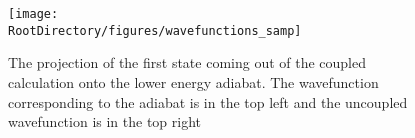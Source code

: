 \begin{figure}[ht]
\begin{center}
    \texttt{[image: \\RootDirectory/figures/wavefunctions\_samp]}
    \caption{
    The projection of the first state coming out of the coupled calculation onto the lower energy adiabat. The \htwo{} wavefunction corresponding to the adiabat is in the top left and the uncoupled \hplus{} wavefunction is in the top right }
\label{fig:wavefunctions_sample}
\end{center}
\end{figure}

